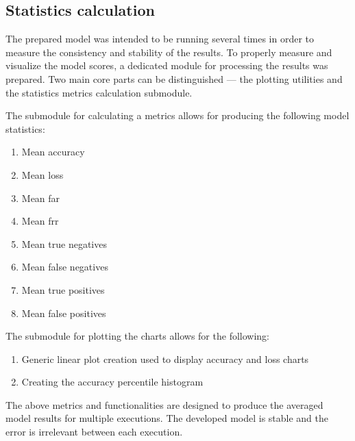 \subsection{Statistics calculation}\label{subsec:statistics-calculation}
The prepared model was intended to be running several times in order to measure the consistency and stability of the results.
To properly measure and visualize the model scores, a dedicated module for processing the results was prepared.
Two main core parts can be distinguished --- the plotting utilities and the statistics metrics calculation submodule.

The submodule for calculating a metrics allows for producing the following model statistics:
\begin{enumerate}
    \item Mean accuracy
    \item Mean loss
    \item Mean \gls{far}
    \item Mean \gls{frr}
    \item Mean true negatives
    \item Mean false negatives
    \item Mean true positives
    \item Mean false positives
\end{enumerate}

The submodule for plotting the charts allows for the following:
\begin{enumerate}
    \item Generic linear plot creation used to display accuracy and loss charts
    \item Creating the accuracy percentile histogram
\end{enumerate}

The above metrics and functionalities are designed to produce the averaged model results for multiple executions.
The developed model is stable and the error is irrelevant between each execution.
